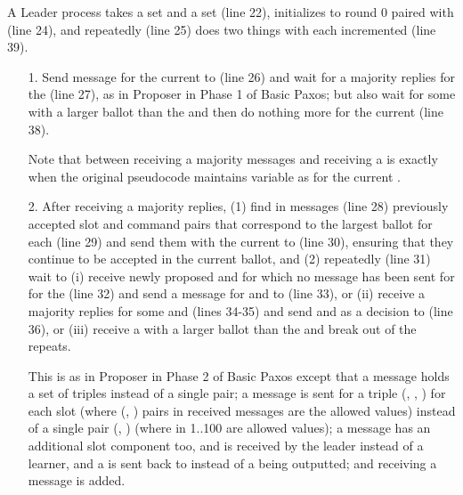 \documentclass[11pt]{article}
\begin{document}
A Leader process takes a set  and a set  (line
22), initializes  to round 0 paired with  (line 24),
and repeatedly (line 25) does two things with each incremented 
(line 39).
\begin{enumerate}

\item[1.] Send  message for the current  to 
  (line 26) and wait for a majority  replies for the 
  (line 27), as in Proposer in Phase 1 of Basic Paxos; but also wait for
  some  with a larger ballot  than the
   and then do nothing more for the current  (line
  38).

  Note that between receiving a majority  messages and receiving a
   is exactly when the original pseudocode maintains
  variable  as  for the current .  

\item[2.] After receiving a majority  replies, (1) find in 
  messages (line 28) previously accepted slot  and command 
  pairs that correspond to the largest ballot for each  (line 29) and
  send them with the current  to  (line 30),
  ensuring that they %
  continue to be accepted in the current ballot, and (2) repeatedly (line
  31) wait to (i) receive newly proposed  and  for which no
   message has been sent for  for the  (line 32)
  and send a  message for  and  to  (line
  33), or (ii) receive a majority  replies for some  and
   (lines 34-35) and send  and  as a decision to
   (line 36), or (iii) receive a  with a larger
  ballot than the  and break out of the repeats.

  This is as in Proposer in Phase 2 of Basic Paxos except that a 
  message holds a set of triples
  instead of a single pair; a  message is sent for a
  triple %
  (, , ) for each slot 
  (where (, ) pairs in received  messages are
  the allowed values) instead of a single
  pair %
  (, ) (where  in 1..100 are allowed values); 
  a  message has an additional slot component too,
  and is received by the leader instead of a learner, and a 
  is sent back to  instead of a  being
  outputted; and receiving a  message is added.

\end{enumerate}
\end{document}
